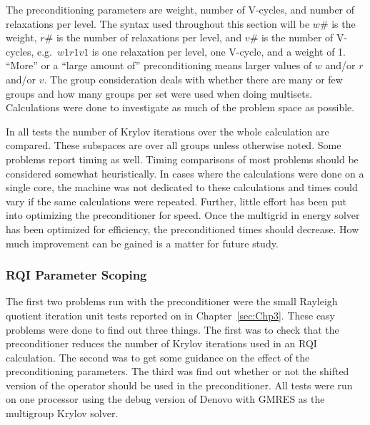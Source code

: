 The preconditioning parameters are weight, number of V-cycles, and number of relaxations per level. The syntax used throughout this section will be $w\#$ is the weight, $r\#$ is the number of relaxations per level, and $v\#$ is the number of V-cycles, e.g.\ $w1r1v1$ is one relaxation per level, one V-cycle, and a weight of 1. ``More'' or a ``large amount of'' preconditioning means larger values of $w$ and/or $r$ and/or $v$. The group consideration deals with whether there are many or few groups and how many groups per set were used when doing multisets. Calculations were done to investigate as much of the problem space as possible.

In all tests the number of Krylov iterations over the whole calculation are compared. These subspaces are over all groups unless otherwise noted. Some problems report timing as well. Timing comparisons of most problems should be considered somewhat heuristically. In cases where the calculations were done on a single core, the machine was not dedicated to these calculations and times could vary if the same calculations were repeated. Further, little effort has been put into optimizing the preconditioner for speed. Once the multigrid in energy solver has been optimized for efficiency, the preconditioned times should decrease. How much improvement can be gained is a matter for future study. 

\subsubsection{RQI Parameter Scoping}
The first two problems run with the preconditioner were the small Rayleigh quotient iteration unit tests reported on in Chapter~\ref{sec:Chp3}. These easy problems were done to find out three things. The first was to check that the preconditioner reduces the number of Krylov iterations used in an RQI calculation. The second was to get some guidance on the effect of the preconditioning parameters. The third was find out whether or not the shifted version of the operator should be used in the preconditioner. All tests were run on one processor using the debug version of Denovo with GMRES as the multigroup Krylov solver.

